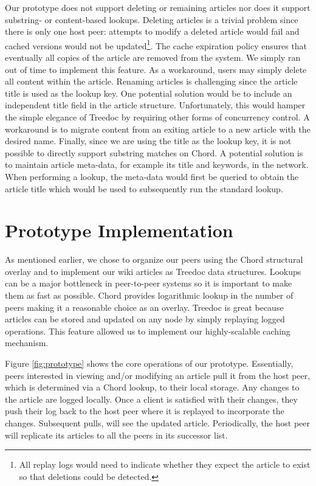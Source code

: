 \documentclass[twocolumn]{article}
\begin{document}
Our prototype does not support deleting or remaining articles nor does it support substring- or content-based lookups. Deleting articles is a trivial problem since there is only one host peer: attempts to modify a deleted article would fail and cached versions would not be updated\footnote{All replay logs would need to indicate whether they expect the article to exist so that deletions could be detected.}. The cache expiration policy ensures that eventually all copies of the article are removed from the system. We simply ran out of time to implement this feature. As a workaround, users may simply delete all content within the article. Renaming articles is challenging since the article title is used as the lookup key. One potential solution would be to include an independent title field in the article structure. Unfortunately, this would hamper the simple elegance of Treedoc by requiring other forms of concurrency control. A workaround is to migrate content from an exiting article to a new article with the desired name. Finally, since we are using the title as the lookup key, it is not possible to directly support substring matches on Chord. A potential solution is to maintain article meta-data, for example its title and keywords, in the network. When performing a lookup, the meta-data would first be queried to obtain the article title which would be used to subsequently run the standard lookup.

\section{Prototype Implementation}
As mentioned earlier, we chose to organize our peers using the Chord structural overlay and to implement our wiki articles as Treedoc data structures. Lookups can be a major bottleneck in peer-to-peer systems so it is important to make them as fast as possible. Chord provides logarithmic lookup in the number of peers making it a reasonable choice as an overlay. Treedoc is great because articles can be stored and updated on any node by simply replaying logged operations. This feature allowed us to implement our highly-scalable caching mechanism.

Figure \ref{fig:prototype} shows the core operations of our prototype. Essentially, peers interested in viewing and/or modifying an article pull it from the host peer, which is determined via a Chord lookup, to their local storage. Any changes to the article are logged locally. Once a client is satisfied with their changes, they push their log back to the host peer where it is replayed to incorporate the changes. Subsequent pulls, will see the updated article. Periodically, the host peer will replicate its articles to all the peers in its successor list.
\end{document}

